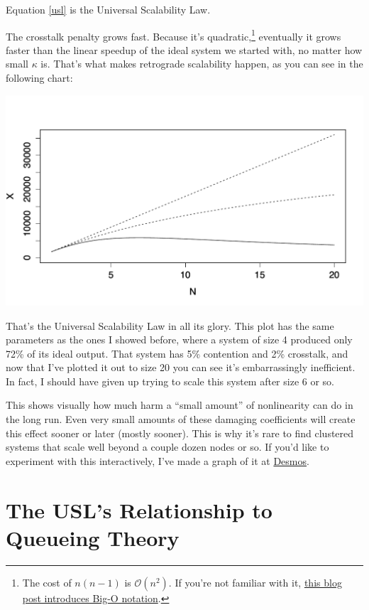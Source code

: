 \documentclass{vivid_layout}
\begin{document}
Equation \ref{usl} is the Universal Scalability Law.

The crosstalk penalty grows fast. Because it's quadratic,\footnote{The cost of
$n(n-1)$ is $\mathcal{O}(n^2)$. If you're not familiar with it,
\href{https://www.vividcortex.com/blog/2013/10/23/big-o-notation-made-simple/}{this
blog post introduces Big-O notation}.} eventually it grows faster than the
linear speedup of the ideal system we started with, no matter how small $\kappa$
is. That's what makes retrograde scalability happen, as you can see in the
following chart:
\begin{center}
\includegraphics[width=.85\linewidth]{scalability/usl}
\end{center}

That's the Universal Scalability Law in all its glory.  This plot has the same
parameters as the ones I showed before, where a system of size 4 produced only
72\% of its ideal output. That system has 5\% contention and 2\% crosstalk,
and now that I've plotted it out to size 20 you can see it's embarrassingly
inefficient.  In fact, I should have given up trying to scale this system after
size 6 or so.

This shows visually how much harm a ``small amount'' of nonlinearity can do in
the long run.  Even very small amounts of these damaging coefficients will
create this effect sooner or later (mostly sooner). This is why it's rare to
find clustered systems that scale well beyond a couple dozen nodes or so.
If you'd like to experiment with this interactively, I've made a graph of it at
\href{https://www.desmos.com/calculator/2l0jcjmsxn}{Desmos}.

\section{The USL's Relationship to Queueing Theory}
\end{document}
